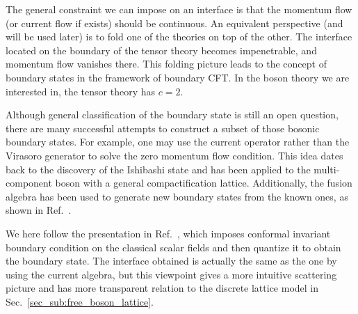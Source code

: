 
The general constraint we can impose on an interface is that the momentum flow (or current flow if exists) should be continuous. An equivalent perspective (and will be used later) is to fold one of the theories on top of the other. The interface located on the boundary of the tensor theory becomes impenetrable, and momentum flow vanishes there. This folding picture leads to the concept of boundary states in the framework of boundary CFT\cite{cardy_boundary_2004,cardy_conformal_1984}. In the boson theory we are interested in, the tensor theory has $c = 2$.

Although general classification of the boundary state is still an open question\cite{affleck_quantum_2001}, there are many successful attempts to construct a subset of those bosonic boundary states. For example, one may use the current operator rather than the Virasoro generator to solve the zero momentum flow condition. This idea dates back to the discovery of the Ishibashi state\cite{ishibashi_boundary_1989} and has been applied to the multi-component boson with a general compactification lattice\cite{affleck_quantum_2001,oshikawa_boundary_2010,quella_reflection_2007}. Additionally, the fusion algebra has been used to generate new boundary states from the known ones, as shown in Ref.~. 

We here follow the presentation in Ref.~, which imposes conformal invariant boundary condition on the classical scalar fields and then quantize it to obtain the boundary state. The interface obtained is actually the same as the one by using the current algebra\cite{affleck_quantum_2001,oshikawa_boundary_2010,quella_reflection_2007}, but this viewpoint gives a more intuitive scattering picture and has more transparent relation to the discrete lattice model in Sec.~\ref{sec_sub:free_boson_lattice}. 

